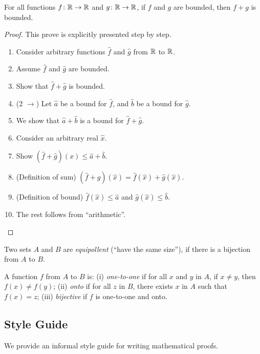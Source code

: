 \begin{theorem}
  For all functions $f\colon  \mathbb{R}\to \mathbb{R}$ and $g\colon  \mathbb{R}\to \mathbb{R}$, if $f$ and
  $g$ are bounded, then $f+g$ is bounded. 
\end{theorem}
\begin{proof}
This prove is explicitly presented step by step.
  \begin{enumerate}
    \item Consider arbitrary functions $\hat{f}$ and $\hat{g}$ from 
    $\mathbb{R}$ to $\mathbb{R}$.
    \item Assume $\hat{f}$ and $\hat{g}$ are bounded. 
    \item Show that $\hat{f} + \hat{g}$ is bounded.
    \item (2 $\rightarrow$) Let $\hat{a}$ be a bound for $\hat{f}$, 
    and $\hat{b}$ be a bound for $\hat{g}$.
    \item We show that $\hat{a} + \hat{b}$ is a bound for 
    $\hat{f} + \hat{g}$.
    \item Consider an arbitrary real $\hat{x}$.
    \item Show $(\hat{f}+\hat{g})(x) \leq \hat{a} + \hat{b}$.
    \item (Definition of sum) $(\hat{f}+\hat{g})(\hat{x}) 
    = \hat{f}(\hat{x}) + \hat{g}(\hat{x})$.
    \item (Definition of bound) $\hat{f}(\hat{x}) \leq \hat{a}$ and 
    $\hat{g}(\hat{x}) \leq \hat{b}$.
    \item The rest follows from ``arithmetic''. 
  \end{enumerate}
\end{proof}

\begin{definition}
  Two sets $A$ and $B$ are \emph{equipollent} (``have the same 
  size''), if there is a bijection from $A$ to $B$.
\end{definition}

\begin{definition}
  A function $f$ from $A$ to $B$ is: 
  (i) \emph{one-to-one} if for all $x$ and $y$ in $A$, if $x \neq y$, then $f(x) \neq f(y)$;
  (ii) \emph{onto} if for all $z$ in $B$, there exists $x$ 
    in $A$ such that $f(x) = z$;
(iii) \emph{bijective} if $f$ is one-to-one and onto.
\end{definition}

\subsection{Style Guide}
We provide an informal style guide for writing mathematical proofs. 

